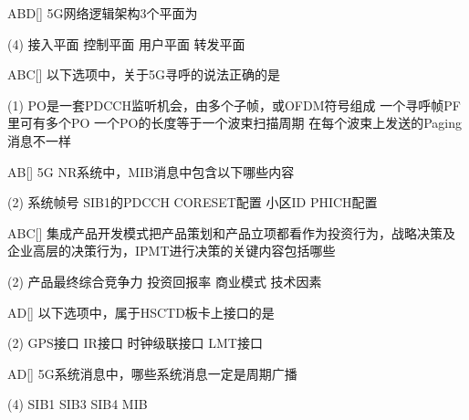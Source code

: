 
\begin{choice}{\;ABD\;}[]
    5G网络逻辑架构3个平面为
    \begin{tasks}(4)
        \task 接入平面
        \task 控制平面
        \task 用户平面
        \task 转发平面
    \end{tasks}
\end{choice}

\begin{choice}{\;ABC\;}[]
    以下选项中，关于5G寻呼的说法正确的是
    \begin{tasks}(1)
        \task PO是一套PDCCH监听机会，由多个子帧，或OFDM符号组成
        \task 一个寻呼帧PF里可有多个PO
        \task 一个PO的长度等于一个波束扫描周期
        \task 在每个波束上发送的Paging消息不一样
    \end{tasks}
\end{choice}

\begin{choice}{\;AB\;}[]
    5G NR系统中，MIB消息中包含以下哪些内容
    \begin{tasks}(2)
        \task 系统帧号
        \task SIB1的PDCCH CORESET配置
        \task 小区ID
        \task PHICH配置
    \end{tasks}
\end{choice}

\begin{choice}{\;ABC\;}[]
    集成产品开发模式把产品策划和产品立项都看作为投资行为，战略决策及企业高层的决策行为，IPMT进行决策的关键内容包括哪些
    \begin{tasks}(2)
        \task 产品最终综合竞争力
        \task 投资回报率
        \task 商业模式
        \task 技术因素
    \end{tasks}
\end{choice}

\begin{choice}{\;AD\;}[]
    以下选项中，属于HSCTD板卡上接口的是
    \begin{tasks}(2)
        \task GPS接口
        \task IR接口
        \task  时钟级联接口
        \task LMT接口
    \end{tasks}
\end{choice}

\begin{choice}{\;AD\;}[]
    5G系统消息中，哪些系统消息一定是周期广播
    \begin{tasks}(4)
        \task SIB1
        \task SIB3
        \task SIB4
        \task MIB
    \end{tasks}
\end{choice}

